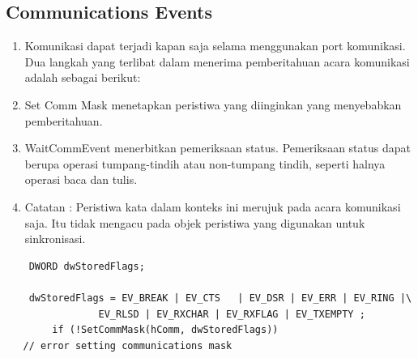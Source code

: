 			\subsection{Communications Events}
				\begin{enumerate}
				\item Komunikasi dapat terjadi kapan saja selama menggunakan port komunikasi. Dua langkah yang terlibat dalam menerima pemberitahuan acara komunikasi adalah sebagai berikut:

				\item Set Comm Mask menetapkan peristiwa yang diinginkan yang menyebabkan pemberitahuan.
			\item WaitCommEvent menerbitkan pemeriksaan status. Pemeriksaan status dapat berupa operasi tumpang-tindih atau non-tumpang tindih, seperti halnya operasi baca dan tulis.
				\item Catatan : Peristiwa kata dalam konteks ini merujuk pada acara komunikasi saja. Itu tidak mengacu pada objek peristiwa yang digunakan untuk sinkronisasi.


				\end{enumerate}
			
	\begin{verbatim}
	DWORD dwStoredFlags;

	dwStoredFlags = EV_BREAK | EV_CTS   | EV_DSR | EV_ERR | EV_RING |\
                EV_RLSD | EV_RXCHAR | EV_RXFLAG | EV_TXEMPTY ;
		if (!SetCommMask(hComm, dwStoredFlags))
   // error setting communications mask
	\end{verbatim}
